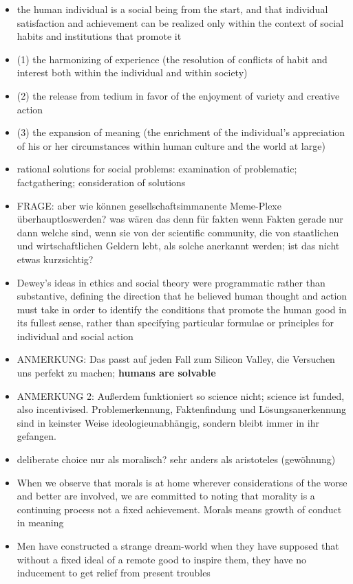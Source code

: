 \documentclass[emulatestandardclasses]{scrartcl}
\begin{document}
\begin{itemize}
  \item the human individual is a social being from the start, and that individual satisfaction and achievement can be realized only within the context of social habits and institutions that promote it
  \item (1) the harmonizing of experience (the resolution of conflicts of habit and interest both within the individual and within society)
  \item (2) the release from tedium in favor of the enjoyment of variety and creative action
  \item (3) the expansion of meaning (the enrichment of the individual's appreciation of his or her circumstances within human culture and the world at large)
  \item rational solutions for social problems: examination of problematic; factgathering; consideration of solutions
  \item FRAGE: aber wie können gesellschaftsimmanente Meme-Plexe überhauptloswerden? was wären das denn für fakten wenn Fakten gerade nur dann welche sind, wenn sie von der scientific community, die von staatlichen und wirtschaftlichen Geldern lebt, als solche anerkannt werden; ist das nicht etwas kurzsichtig?
  \item Dewey's ideas in ethics and social theory were programmatic rather than substantive, defining the direction that he believed human thought and action must take in order to identify the conditions that promote the human good in its fullest sense, rather than specifying particular formulae or principles for individual and social action
  \item ANMERKUNG: Das passt auf jeden Fall zum Silicon Valley, die Versuchen uns perfekt zu machen; \textbf{humans are solvable}
  \item ANMERKUNG 2: Außerdem funktioniert so science nicht; science ist funded, also incentivised. Problemerkennung, Faktenfindung und Lösungsanerkennung sind in keinster Weise ideologieunabhängig, sondern bleibt immer in ihr gefangen. 
\end{itemize}

\begin{itemize}
  \item deliberate choice nur als moralisch? sehr anders als aristoteles (gewöhnung)
  \item When we observe that morals is at home wherever considerations of the worse and better are involved, we are committed to noting that morality is a continuing process not a fixed achievement. Morals means growth of conduct in meaning
  \item Men have constructed a strange dream-world when they have supposed that without a fixed ideal of a remote good to inspire them, they have no inducement to get relief from present troubles
\end{itemize}
\end{document}
